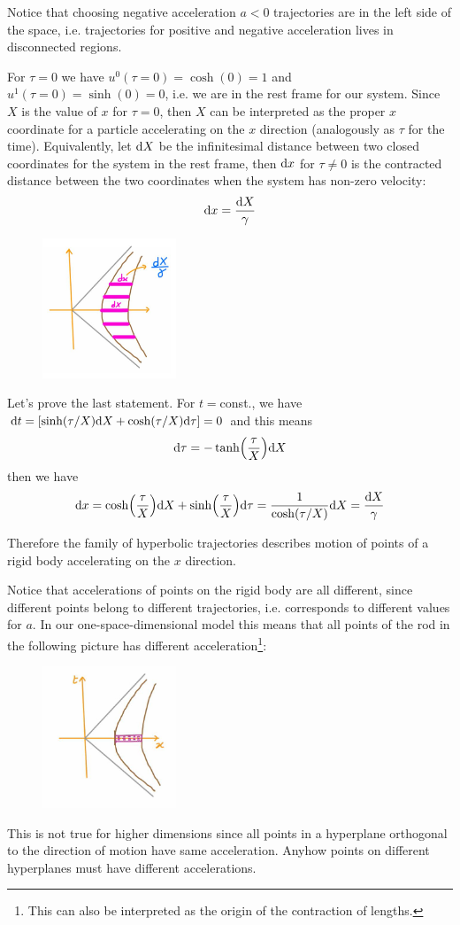 \documentclass[../main/main.tex]{subfiles}
\begin{document}
Notice that choosing negative acceleration $a<0$ trajectories are in the left side of the space, i.e. trajectories for positive and negative acceleration lives in disconnected regions. 

For $\tau=0$ we have $u^0(\tau=0)=\cosh(0)=1$ and $u^1(\tau=0)=\sinh(0)=0$, i.e. we are in the rest frame for our system. Since $X$ is the value of $x$ for $\tau=0$, then $X$ can be interpreted as the proper $x$ coordinate for a particle accelerating on the $x$ direction (analogously as $\tau$ for the time). Equivalently, let $\textup{d} X$ be the infinitesimal distance between two closed coordinates for the system in the rest frame, then $\textup{d} x$ for $\tau\neq0$ is the contracted distance between the two coordinates when the system has non-zero velocity:
\[\textup{d} x=\frac{\textup{d} X}\gamma\]
\begin{figure}[H]
\centering
\includegraphics[width=4cm]{../img/X-proper-lenght-Rindler.jpg}
\end{figure}
Let's prove the last statement. For $t=$const., we have $\textup{d} t=[\sinh(\tau/X)\textup{d} X+\cosh(\tau/X)\textup{d}\tau]=0$ and this means
\[\textup{d}\tau=-\tanh(\frac\tau X)\textup{d} X\]
then we have
\[\textup{d} x=\cosh(\frac\tau X)\textup{d} X+\sinh(\frac\tau X)\textup{d}\tau=\frac1{\cosh(\tau/X)}\textup{d} X=\frac{\textup{d} X}\gamma\]

Therefore the family of hyperbolic trajectories describes motion of points of a rigid body accelerating on the $x$ direction. 

Notice that accelerations of points on the rigid body are all different, since different points belong to different trajectories, i.e. corresponds to different values for $a$. In our one-space-dimensional model this means that all points of the rod in the following picture has different acceleration\footnote{This can also be interpreted as the origin of the contraction of lengths.}:
\begin{figure}[H]
\centering
\includegraphics[width=4cm]{../img/acceleration-points-rigid-body.jpg}
\end{figure}
This is not true for higher dimensions since all points in a hyperplane orthogonal to the direction of motion have same acceleration. Anyhow points on different hyperplanes must have different accelerations.
\end{document}

